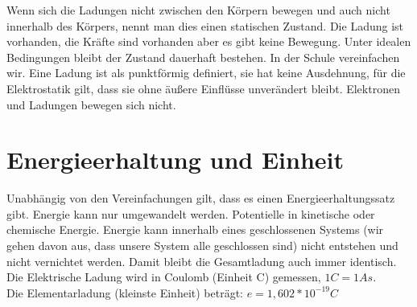 \documentclass[aspectratio=169, ignorenonframetext]{beamer}
\begin{document}
Wenn sich die Ladungen nicht zwischen den Körpern bewegen und auch nicht innerhalb des Körpers, nennt man dies einen statischen Zustand. Die Ladung ist vorhanden, die Kräfte sind vorhanden aber es gibt keine Bewegung. Unter idealen Bedingungen bleibt der Zustand dauerhaft bestehen. In der Schule vereinfachen wir. Eine Ladung ist als punktförmig definiert, sie hat keine Ausdehnung, für die Elektrostatik gilt, dass sie ohne äußere Einflüsse unverändert bleibt. Elektronen und Ladungen bewegen sich nicht.

\section[Energieerhaltung]{Energieerhaltung und Einheit}

Unabhängig von den Vereinfachungen gilt, dass es einen Energieerhaltungssatz gibt. Energie kann nur umgewandelt werden. Potentielle in kinetische oder chemische Energie. Energie kann innerhalb eines geschlossenen Systems (wir gehen davon aus, dass unsere System alle geschlossen sind) nicht entstehen und nicht vernichtet werden. Damit bleibt die Gesamtladung auch immer identisch. Die Elektrische Ladung wird in Coulomb (Einheit C) gemessen, $1 C = 1 As$. \\ Die Elementarladung (kleinste Einheit) beträgt: $e = 1,602 * 10^{-19} C$
\end{document}

